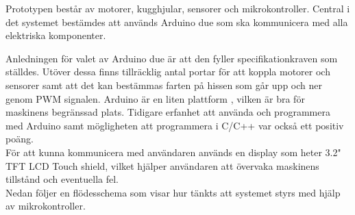 Prototypen består av motorer, kugghjular, sensorer och mikrokontroller. Central i det systemet bestämdes att används Arduino due som ska kommunicera med alla elektriska komponenter.

Anledningen för valet av Arduino due är att den fyller specifikationkraven som ställdes. Utöver dessa finns tillräcklig antal portar för att koppla motorer och sensorer samt att det kan bestämmas farten på hissen som går upp och ner genom PWM signalen. Arduino är en liten plattform , vilken är bra för maskinens begränssad plats. Tidigare erfanhet att använda och programmera med Arduino samt mögligheten att programmera i C/C++ var också ett positiv poäng.\\ 



För att kunna kommunicera med användaren används en display som heter 3.2" TFT LCD Touch shield, vilket hjälper användaren att övervaka maskinens tillstånd och eventuella fel.\\

Nedan följer en flödesschema som visar hur tänkts att systemet styrs med hjälp av mikrokontroller.